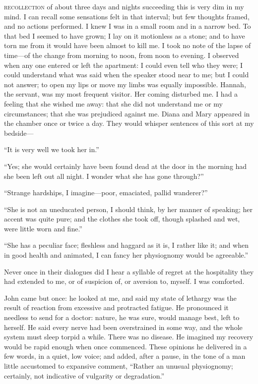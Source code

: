 
 \textsc{recollection} of about three days and nights succeeding this is very
dim in my mind. I can recall some sensations felt in that interval; but
few thoughts framed, and no actions performed. I knew I was in a small
room and in a narrow bed. To that bed I seemed to have grown; I lay on
it motionless as a stone; and to have torn me from it would have been
almost to kill me. I took no note of the lapse of time---of the change
from morning to noon, from noon to evening. I observed when any one
entered or left the apartment: I could even tell who they were; I could
understand what was said when the speaker stood near to me; but I could
not answer; to open my lips or move my limbs was equally impossible.
Hannah, the servant, was my most frequent visitor. Her coming disturbed
me. I had a feeling that she wished me away: that she did not
understand me or my circumstances; that she was prejudiced against me.
Diana and Mary appeared in the chamber once or twice a day. They would
whisper sentences of this sort at my bedside---

\enquote{It is very well we took her in.}

\enquote{Yes; she would certainly have been found dead at the door in
	the morning had she been left out all night. I wonder what she has gone
	through?}

\enquote{Strange hardships, I imagine---poor, emaciated, pallid
	wanderer?}

\enquote{She is not an uneducated person, I should think, by her manner
	of speaking; her accent was quite pure; and the clothes she took off,
	though splashed and wet, were little worn and fine.}

\enquote{She has a peculiar face; fleshless and haggard as it is, I
	rather like it; and when in good health and animated, I can fancy her
	physiognomy would be agreeable.}

Never once in their dialogues did I hear a syllable of regret at the
hospitality they had extended to me, or of suspicion of, or aversion to,
myself. I was comforted.

\Mr{} \St{} John came but once: he looked at me, and said my state of
lethargy was the result of reaction from excessive and protracted
fatigue. He pronounced it needless to send for a doctor: nature, he was
sure, would manage best, left to herself. He said every nerve had been
overstrained in some way, and the whole system must sleep torpid a
while. There was no disease. He imagined my recovery would be rapid
enough when once commenced. These opinions he delivered in a few words,
in a quiet, low voice; and added, after a pause, in the tone of a man
little accustomed to expansive comment, \enquote{Rather an unusual
	physiognomy; certainly, not indicative of vulgarity or degradation.}

